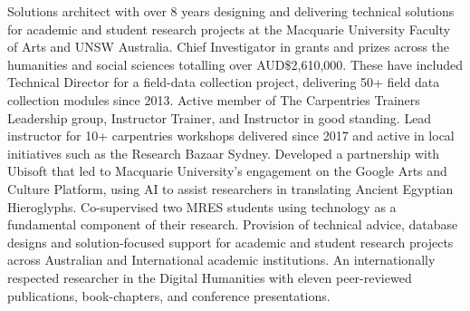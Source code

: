 
Solutions architect with over 8 years designing and delivering technical solutions for academic and student research projects at the Macquarie University Faculty of Arts and UNSW Australia. Chief Investigator in grants and prizes across the humanities and social sciences totalling over AUD\$2,610,000. These have included Technical Director for a field-data collection project, delivering 50+ field data collection modules since 2013. Active member of The Carpentries Trainers Leadership group, Instructor Trainer, and Instructor in good standing. Lead instructor for 10+ carpentries workshops delivered since 2017 and active in local initiatives such as the Research Bazaar Sydney. Developed a partnership with Ubisoft that led to Macquarie University's engagement on the Google Arts and Culture Platform, using AI to assist researchers in translating Ancient Egyptian Hieroglyphs. Co-supervised two MRES students using technology as a fundamental component of their research. Provision of technical advice, database designs and solution-focused support for academic and student research projects across Australian and International academic institutions. An internationally respected researcher in the Digital Humanities with eleven peer-reviewed publications, book-chapters, and conference presentations.


